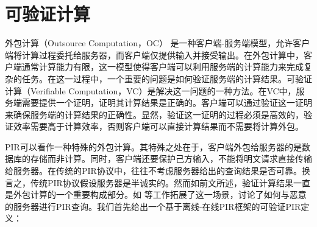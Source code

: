 \section{可验证计算}
外包计算（Outsource Computation，OC） \cite{USENIX:GreHohWat11, C:ChuKalVad10} 是一种客户端-服务端模型，允许客户端将计算过程委托给服务器，而客户端仅提供输入并接受输出。在外包计算中，客户端通常计算能力有限，这一模型使得客户端可以利用服务端的计算能力来完成复杂的任务。在这一过程中，一个重要的问题是如何验证服务端的计算结果。可验证计算（Verifiable Computation，VC）是解决这一问题的一种方法。在VC中，服务端需要提供一个证明，证明其计算结果是正确的。客户端可以通过验证这一证明来确保服务端的计算结果的正确性。显然，验证这一证明的过程必须是高效的，验证效率需要高于计算效率，否则客户端可以直接计算结果而不需要将计算外包。

PIR可以看作一种特殊的外包计算。其特殊之处在于，客户端外包给服务器的是数据库的存储而非计算。同时，客户端还要保护己方输入，不能将明文请求直接传输给服务器。在传统的PIR协议中，往往不考虑服务器给出的查询结果是否可靠。换言之，传统PIR协议假设服务器是半诚实的。然而如前文所述，验证计算结果一直是外包计算的一个重要构成部分。如 \cite{VeriSimplePIR, APIR, SVPIR18} 等工作拓展了这一场景，讨论了如何与恶意的服务器进行PIR查询。我们首先给出一个基于离线-在线PIR框架的可验证PIR定义：

